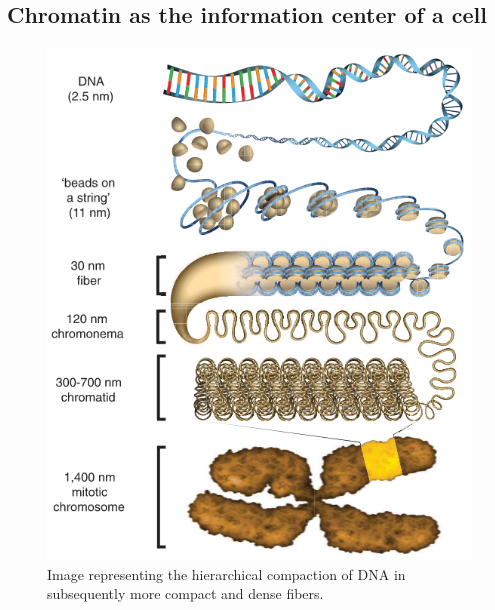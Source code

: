 \subsection{Chromatin as the information center of a cell} \label{intro: chromatin}

\begin{figure}
    \includegraphics[width=\textwidth]{./images/HierarchicalDNA.png}
    \caption{Image representing the hierarchical compaction of DNA in subsequently more compact and dense fibers.}
    \label{fig: chromatin compaction}
\end{figure}

